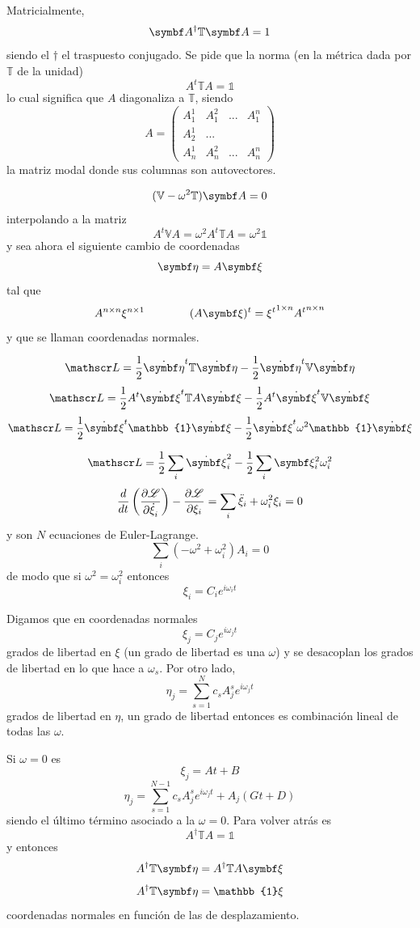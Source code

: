 \documentclass[10pt,oneside]{CBFT_book}
\begin{document}
Matricialmente,
\[
	\vb{A}^\dagger \mathbb{T} \vb{A} = 1
\]
siendo el $\dagger$ el traspuesto conjugado. Se pide que la norma (en la métrica dada por $\mathbb{T}$ de la unidad)
\[
	A^t \mathbb{T} A = \mathbb{1}
\]
lo cual significa que $A$ diagonaliza a $\mathbb{T}$, siendo 
\[
	A = \begin{pmatrix}
	     A_1^1 & A_1^2 & ... & A_1^n \\
	     A_2^1 & ... \\
	     A_n^1 & A_n^2 & ... & A_n^n 
	    \end{pmatrix}
\]
la matriz modal donde sus columnas son autovectores.

\[
	(\mathbb{V} - \omega^2 \mathbb{T})\vb{A} = 0
\]
interpolando a la matriz 
\[
	A^t \mathbb{V} A = \omega^2 A^t \mathbb{T} A= \omega^2 \mathbb{1}
\]
y sea ahora el siguiente cambio de coordenadas
\[
	\vb{\eta} = A \vb{\xi}
\]
tal que 
\[
	A^{n\times n} \xi^{n\times 1} \qquad \qquad  (A \vb{\xi} )^t = {\xi^t}^{1 \times n} {A^t}^{n \times n}
\]
y que se llaman coordenadas normales.

\[
	\Lag = \frac{1}{2} \dot{\vb{\eta}}^t \mathbb{T} \dot{\vb{\eta}} - \frac{1}{2} \dot{\vb{\eta}}^t \mathbb{V} \dot{\vb{\eta}}
\]
\[
	\Lag = \frac{1}{2} A^t\dot{\vb{\xi}}^t \mathbb{T} A \dot{\vb{\xi}} - \frac{1}{2} A^t\dot{\vb{\xi}}^t \mathbb{V} 
\dot{\vb{\xi}}
\]
\[
	\Lag = \frac{1}{2} \dot{\vb{\xi}}^t \mathbb{1} \dot{\vb{\xi}} - \frac{1}{2} \dot{\vb{\xi}}^t \omega^2 \mathbb{1} \dot{\vb{\xi}}
\]

\[
	\Lag = \frac{1}{2} \sum_i \dot{\vb{\xi}}_i^2 - \frac{1}{2} \sum_i \vb{\xi}_i^2 \omega^2_i 
\]
\[
	\frac{d}{dt}\left( \frac{\partial^{\hspace{-0.05em}} {\mathscr{L}}}{\partial {\dot{\xi}_i}^{\hspace{-0.05em}}} \right)- \frac{\partial^{\hspace{-0.05em}} {\mathscr{L}}}{\partial {\xi_i}^{\hspace{-0.05em}}} = \sum_i \ddot{\xi}_i + \omega^2_i \xi_i = 0 
\]
y son $N$ ecuaciones de Euler-Lagrange.
\[
	\sum_i ( -\omega^2 + \omega^2_i ) A_i = 0
\]
de modo que si $\omega^2 = \omega^2_i$ entonces
\[
	\xi_i = C_i e^{i\omega_i t}
\]

Digamos que en coordenadas normales
\[
	\xi_j = C_j e^{i \omega_j t}
\]
grados de libertad en $\xi$ (un grado de libertad es una $\omega$) y se desacoplan los grados de libertad
en lo que hace a $\omega_s$.
Por otro lado,
\[
	\eta_j = \sum_{s=1}^N c_s A_j^s e^{i \omega_j t}
\]
grados de libertad en $\eta$, un grado de libertad entonces es combinación lineal de todas las $\omega$.

Si $\omega=0$ es 
\[
	\xi_j = At + B 
\]
\[
	\eta_j = \sum_{s=1}^{N-1} c_s A_j^s e^{i \omega_j t} + A_j(Gt + D)
\]
siendo el último término asociado a la $\omega=0$.
Para volver atrás es 
\[
	A^{\dagger} \mathbb{T} A = \mathbb{1}
\]
y entonces 
\[
	A^{\dagger} \mathbb{T} \vb{\eta} = A^{\dagger} \mathbb{T} A \vb{\xi}  
\]
\[
	A^{\dagger} \mathbb{T} \vb{\eta} = \mathbb{1} \xi
\]
coordenadas normales en función de las de desplazamiento.
\end{document}
